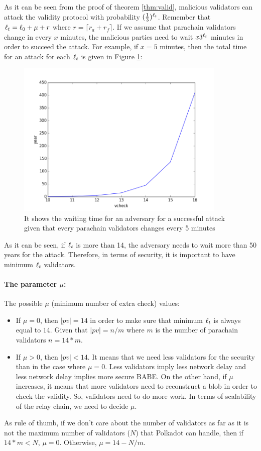As it can be seen from the proof of theorem \ref{thm:valid}, malicious validators can attack the validity protocol with probability $(\frac{1}{3})^{\ell_t}$. Remember that $\ell_t = \ell_0 + \mu + r$ where $r = \lceil r_a + r_f \rceil$. If we assume that parachain validators change in every $x$ minutes, the malicious parties need to wait $x3^{\ell_t}$ minutes in order to succeed the attack. For example, if $x = 5$ minutes, then the total time for an attack for each $\ell_t$ is given in Figure \ref{fig:totaltime}:


\begin{figure}[h]\centering
	  \includegraphics[width=10cm]{images/year.png}
	  \caption{It shows the waiting time for an adversary for a successful attack given that every parachain validators changes every 5 minutes}
	  \label{fig:totaltime}
\end{figure}

As it can be seen,  if $\ell_t$ is more than 14, the adversary needs to wait more than 50 years for the attack. Therefore, in terms of security, it is important to have  minimum $\ell_t$ validators.

\paragraph{The parameter $\mu$:} The possible $\mu$ (minimum number of extra check) values:

\begin{itemize}
    \item If $\mu = 0$, then $|pv| = 14$ in order to make sure that minimum $\ell_t$ is always equal to $14$. Given that $|pv| = n/m$ where $m$ is the number of parachain validators $n = 14 * m$. 
    
    \item If $\mu > 0$, then $|pv| < 14$. It means that we need less validators for the security than in the case where $\mu = 0$. Less validators imply less network delay and less network delay implies more secure BABE. On the other hand, if $\mu$ increases, it means that more validators need to reconstruct a blob in order to check the validity. So, validators need to do more work. In terms of scalability of the relay chain, we need to decide $\mu$. 
\end{itemize}
As rule of thumb, if we don't care about the number of validators as far as it is not the maximum  number of validators ($N$) that Polkadot can handle, then if $14 * m < N$, $\mu = 0$. Otherwise, $\mu = 14 -N/m$. 

